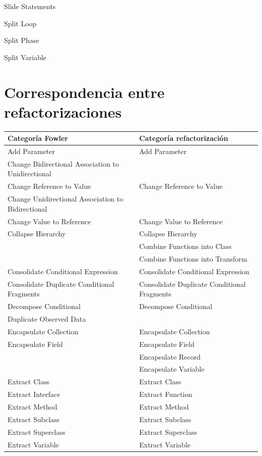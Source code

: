\documentclass[11pt,a4paper,oneside]{book}
\begin{document}
Slide Statements

Split Loop

Split Phase

Split Variable



\chapter*{Correspondencia entre refactorizaciones}

\begin{longtable}{|p{200pt}|p{200pt}|}
\footnotesize
 Categoría Fowler &Categoría refactorización\\ 
\hline
    Add Parameter & Add Parameter\\ 
    Change Bidirectional Association to Unidirectional & \\ 
    Change Reference to Value & Change Reference to Value\\ 
    Change Unidirectional Association to Bidirectional & \\ 
    Change Value to Reference & Change Value to Reference\\ 
    Collapse Hierarchy & Collapse Hierarchy\\ 
 & Combine Functions into Class\\ 
 & Combine Functions into Transform\\ 
    Consolidate Conditional Expression & Consolidate Conditional Expression\\ 
    Consolidate Duplicate Conditional Fragments & Consolidate Duplicate Conditional Fragments\\ 
    Decompose Conditional & Decompose Conditional\\ 
    Duplicate Observed Data & \\ 
    Encapsulate Collection & Encapsulate Collection\\ 
    Encapsulate Field & Encapsulate Field \\ 
 & Encapsulate Record\\ 
 & Encapsulate Variable\\ 
    Extract Class & Extract Class\\ 
    Extract Interface & Extract Function\\ 
    Extract Method & Extract Method\\ 
    Extract Subclass & Extract Subclass \\ 
    Extract Superclass & Extract Superclass\\ 
    Extract Variable & Extract Variable\\ 

\end{longtable}
\end{document}
